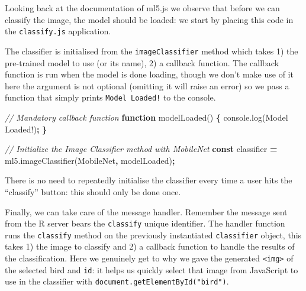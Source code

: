\documentclass[
]{krantz}
\makeatletter
\newenvironment{Shaded}{\begin{snugshade}}{\end{snugshade}}
\newcommand{\AttributeTok}[1]{\textcolor[rgb]{0.61,0.61,0.61}{#1}}
\newcommand{\CommentTok}[1]{\textcolor[rgb]{0.37,0.37,0.37}{\textit{#1}}}
\newcommand{\KeywordTok}[1]{\textcolor[rgb]{0.27,0.27,0.27}{\textbf{#1}}}
\newcommand{\NormalTok}[1]{#1}
\newcommand{\OperatorTok}[1]{\textcolor[rgb]{0.43,0.43,0.43}{\textbf{#1}}}
\newcommand{\StringTok}[1]{\textcolor[rgb]{0.5,0.5,0.5}{#1}}
\newcommand{\VariableTok}[1]{\textcolor[rgb]{0,0,0}{#1}}
\newenvironment{kframe}{%
\medskip{}
\setlength{\fboxsep}{.8em}
 \def\at@end@of@kframe{}%
 \ifinner\ifhmode%
  \def\at@end@of@kframe{\end{minipage}}%
  \begin{minipage}{\columnwidth}%
 \fi\fi%
 \def\FrameCommand##1{\hskip\@totalleftmargin \hskip-\fboxsep
 \colorbox{shadecolor}{##1}\hskip-\fboxsep
     \hskip-\linewidth \hskip-\@totalleftmargin \hskip\columnwidth}%
 \MakeFramed {\advance\hsize-\width
   \@totalleftmargin\z@ \linewidth\hsize
   \@setminipage}}%
 {\par\unskip\endMakeFramed%
 \at@end@of@kframe}
\renewenvironment{Shaded}{\begin{kframe}}{\end{kframe}}
\newenvironment{rmdblock}[1]
  {
  \begin{itemize}
  \renewcommand{\labelitemi}{
    \raisebox{-.7\height}[0pt][0pt]{
      {\setkeys{Gin}{width=3em,keepaspectratio}\texttt{[image: images/\#1]}}
    }
  }
  \setlength{\fboxsep}{1em}
  \begin{kframe}
  \item
  }
  {
  \end{kframe}
  \end{itemize}
  }
\newenvironment{rmdnote}
  {\begin{rmdblock}{note}}
  {\end{rmdblock}}
\makeatother
\begin{document}
Looking back at the documentation of ml5.js we observe that before we can classify the image, the model should be loaded: we start by placing this code in the \texttt{classify.js} application.

The classifier is initialised from the \texttt{imageClassifier} method which takes 1) the pre-trained model to use (or its name), 2) a callback function. The callback function is run when the model is done loading, though we don't make use of it here the argument is not optional (omitting it will raise an error) so we pass a function that simply prints \texttt{Model\ Loaded!} to the console.

\begin{Shaded}
\begin{Highlighting}[]
\CommentTok{// Mandatory callback function}
\KeywordTok{function} \AttributeTok{modelLoaded}\NormalTok{() }\OperatorTok{\{}
  \VariableTok{console}\NormalTok{.}\AttributeTok{log}\NormalTok{(}\StringTok{\textquotesingle{}Model Loaded!\textquotesingle{}}\NormalTok{)}\OperatorTok{;}
\OperatorTok{\}}

\CommentTok{// Initialize the Image Classifier method with MobileNet}
\KeywordTok{const}\NormalTok{ classifier }\OperatorTok{=} \VariableTok{ml5}\NormalTok{.}\AttributeTok{imageClassifier}\NormalTok{(}\StringTok{\textquotesingle{}MobileNet\textquotesingle{}}\OperatorTok{,}\NormalTok{ modelLoaded)}\OperatorTok{;}
\end{Highlighting}
\end{Shaded}

\begin{rmdnote}
There is no need to repeatedly initialise the classifier every time a
user hits the ``classify'' button: this should only be done once.
\end{rmdnote}

Finally, we can take care of the message handler. Remember the message sent from the R server bears the \texttt{classify} unique identifier. The handler function runs the \texttt{classify} method on the previously instantiated \texttt{classifier} object, this takes 1) the image to classify and 2) a callback function to handle the results of the classification. Here we genuinely get to why we gave the generated \texttt{\textless{}img\textgreater{}} of the selected bird and \texttt{id}: it helps us quickly select that image from JavaScript to use in the classifier with \texttt{document.getElementById("bird")}.
\end{document}
